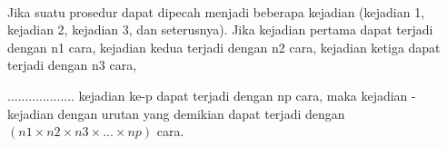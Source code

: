 \paragraph*{}
	Jika suatu prosedur dapat dipecah menjadi beberapa kejadian (kejadian 1, kejadian 2, kejadian 3, dan seterusnya).
	Jika kejadian pertama dapat terjadi dengan n1 cara,
	kejadian kedua terjadi dengan n2 cara,
	kejadian ketiga dapat terjadi dengan n3 cara,\par
	...................
	kejadian ke-p dapat terjadi dengan np cara,
	maka kejadian - kejadian dengan urutan yang demikian dapat terjadi dengan
	$(n1\times n2\times n3\times...\times np)$ cara.
